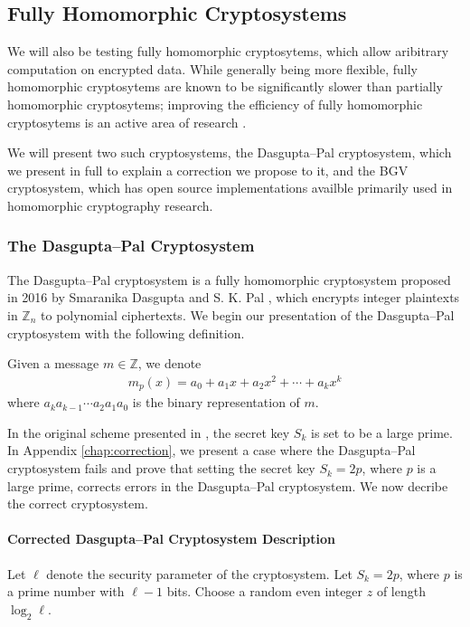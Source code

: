 \subsection{Fully Homomorphic Cryptosystems}
We will also be testing fully homomorphic cryptosytems, which allow aribitrary computation on encrypted data.
While generally being more flexible, fully homomorphic cryptosytems are known to be significantly slower than partially homomorphic cryptosytems; improving the efficiency of fully homomorphic cryptosytems is an active area of research \cite{sen_homomorphic_2013}.

We will present two such cryptosystems, the Dasgupta--Pal cryptosystem, which we present in full to explain a correction we propose to it, and the BGV cryptosystem, which has open source implementations availble primarily used in homomorphic cryptography research.

\subsubsection{The Dasgupta--Pal Cryptosystem}
The Dasgupta--Pal cryptosystem is a fully homomorphic cryptosystem proposed in 2016 by Smaranika Dasgupta and S. K. Pal \cite{dasgupta_design_2016}, which encrypts integer plaintexts in $\mathbb{Z}_n$ to polynomial ciphertexts. We begin our presentation of the Dasgupta--Pal cryptosystem with the following definition.

Given a message $m \in \mathbb{Z}$, we denote
\begin{align*}
		m_p(x) = a_0 + a_1 x + a_2 x^2 + \cdots + a_k x^k
\end{align*}
where $a_k a_{k-1}\cdots a_2 a_1 a_0$ is the binary representation of $m$.

In the original scheme presented in \cite{dasgupta_design_2016}, the secret key $S_k$ is set to be a large prime. In Appendix \ref{chap:correction}, we present a case where the Dasgupta--Pal cryptosystem fails and prove that setting the secret key $S_k = 2p$, where $p$ is a large prime, corrects errors in the Dasgupta--Pal cryptosystem.
We now decribe the correct cryptosystem.
\paragraph{Corrected Dasgupta--Pal Cryptosystem Description}
Let $\ell$ denote the security parameter of the cryptosystem.
Let $S_k = 2p$, where $p$ is a prime number with $\ell - 1$ bits.
Choose a random even integer $z$ of length $\log_2{\ell}$.

